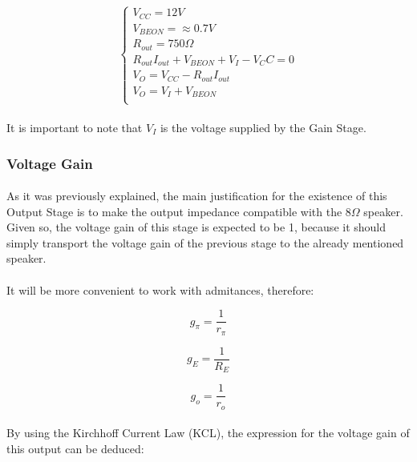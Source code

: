 \[ 
\left\{\begin{matrix}
	V_{CC}=12 V\\
	V_{BEON}=\approx 0.7 V\\
	R_{out}= 750 \Omega\\
	R_{out} I_{out} + V_{BEON} + V_I - V_CC = 0\\
	V_O = V_{CC} - R_{out} I_{out}\\
	V_O=V_I + V_{BEON}\\
\end{matrix}\right.
\]

\paragraph{}It is important to note that $V_I$ is the voltage supplied by the Gain Stage.

\subsubsection{Voltage Gain}

\paragraph{}As it was previously explained, the main justification for the existence of this Output Stage is to make the output impedance compatible with the $8\Omega$ speaker. Given so, the voltage gain of this stage is expected to be 1, because it should simply transport the voltage gain of the previous stage to the already mentioned speaker.

\paragraph{}It will be more convenient to work with admitances, therefore:

\begin{equation}
    g_\pi=\frac{1}{r_\pi}
\end{equation}

\begin{equation}
    g_E=\frac{1}{R_E}
\end{equation}

\begin{equation}
    g_o=\frac{1}{r_o}
\end{equation}

\paragraph{}By using the Kirchhoff Current Law (KCL), the expression for the voltage gain of this output can be deduced:

